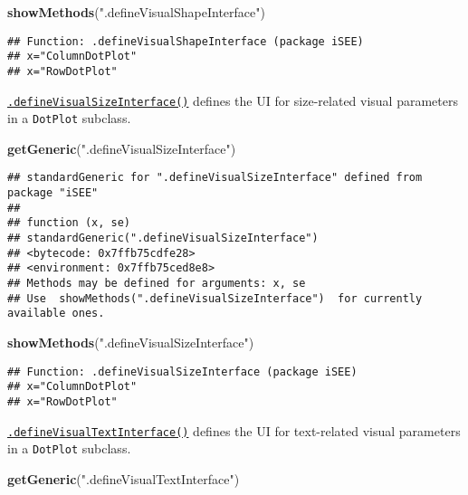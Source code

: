 \documentclass[
]{book}
\newenvironment{Shaded}{\begin{snugshade}}{\end{snugshade}}
\newcommand{\KeywordTok}[1]{\textcolor[rgb]{0.13,0.29,0.53}{\textbf{#1}}}
\newcommand{\NormalTok}[1]{#1}
\newcommand{\StringTok}[1]{\textcolor[rgb]{0.31,0.60,0.02}{#1}}
\begin{document}
\begin{Shaded}
\begin{Highlighting}[]
\KeywordTok{showMethods}\NormalTok{(}\StringTok{".defineVisualShapeInterface"}\NormalTok{)}
\end{Highlighting}
\end{Shaded}

\begin{verbatim}
## Function: .defineVisualShapeInterface (package iSEE)
## x="ColumnDotPlot"
## x="RowDotPlot"
\end{verbatim}

\href{https://isee.github.io/iSEE/reference/visual-parameters-generics.html}{\texttt{.defineVisualSizeInterface()}} defines the UI for size-related visual parameters in a \texttt{DotPlot} subclass.

\begin{Shaded}
\begin{Highlighting}[]
\KeywordTok{getGeneric}\NormalTok{(}\StringTok{".defineVisualSizeInterface"}\NormalTok{)}
\end{Highlighting}
\end{Shaded}

\begin{verbatim}
## standardGeneric for ".defineVisualSizeInterface" defined from package "iSEE"
## 
## function (x, se) 
## standardGeneric(".defineVisualSizeInterface")
## <bytecode: 0x7ffb75cdfe28>
## <environment: 0x7ffb75ced8e8>
## Methods may be defined for arguments: x, se
## Use  showMethods(".defineVisualSizeInterface")  for currently available ones.
\end{verbatim}

\begin{Shaded}
\begin{Highlighting}[]
\KeywordTok{showMethods}\NormalTok{(}\StringTok{".defineVisualSizeInterface"}\NormalTok{)}
\end{Highlighting}
\end{Shaded}

\begin{verbatim}
## Function: .defineVisualSizeInterface (package iSEE)
## x="ColumnDotPlot"
## x="RowDotPlot"
\end{verbatim}

\href{https://isee.github.io/iSEE/reference/visual-parameters-generics.html}{\texttt{.defineVisualTextInterface()}} defines the UI for text-related visual parameters in a \texttt{DotPlot} subclass.

\begin{Shaded}
\begin{Highlighting}[]
\KeywordTok{getGeneric}\NormalTok{(}\StringTok{".defineVisualTextInterface"}\NormalTok{)}
\end{Highlighting}
\end{Shaded}
\end{document}
